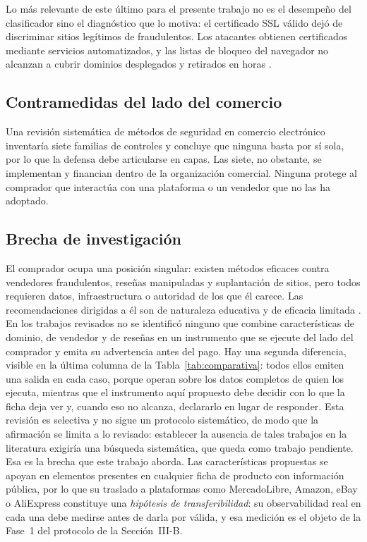Lo más relevante de este último para el presente trabajo no es el desempeño del clasificador
sino el diagnóstico que lo motiva: el certificado SSL válido dejó de discriminar sitios
legítimos de fraudulentos. Los atacantes obtienen certificados mediante servicios automatizados,
y las listas de bloqueo del navegador no alcanzan a cubrir dominios desplegados y retirados en
horas \cite{ref25}.

\subsection{Contramedidas del lado del comercio}

Una revisión sistemática de métodos de seguridad en comercio electrónico \cite{ref30} inventaría
siete familias de controles y concluye que ninguna basta por sí sola, por lo que la
defensa debe articularse en capas. Las siete, no obstante, se implementan y financian dentro
de la organización comercial. Ninguna protege al comprador que interactúa con una plataforma o
un vendedor que no las ha adoptado.

\subsection{Brecha de investigación}

El comprador ocupa una posición singular: existen métodos eficaces contra vendedores
fraudulentos, reseñas manipuladas y suplantación de sitios, pero todos requieren datos,
infraestructura o autoridad de los que él carece. Las recomendaciones dirigidas a él son de
naturaleza educativa y de eficacia limitada \cite{ref27, ref3}. En los trabajos revisados no
se identificó ninguno que combine características de dominio, de vendedor y de reseñas en un
instrumento que se ejecute del lado del comprador y emita su advertencia antes del pago. Hay
una segunda diferencia, visible en la última columna de la Tabla~\ref{tab:comparativa}: todos
ellos emiten una salida en cada caso, porque operan sobre los datos completos de quien los
ejecuta, mientras que el instrumento aquí propuesto debe decidir con lo que la ficha deja ver
y, cuando eso no alcanza, declararlo en lugar de responder. Esta
revisión es selectiva y no sigue un protocolo sistemático, de modo que la afirmación se limita
a lo revisado: establecer la ausencia de tales trabajos en la literatura exigiría una búsqueda
sistemática, que queda como trabajo pendiente. Esa es la brecha que este trabajo aborda. Las
características propuestas se apoyan en elementos presentes en cualquier ficha de producto con
información pública, por lo que su traslado a plataformas como MercadoLibre, Amazon, eBay o
AliExpress constituye una \emph{hipótesis de transferibilidad}: su observabilidad real en cada
una debe medirse antes de darla por válida, y esa medición es el objeto de la Fase~1 del
protocolo de la Sección~III-B.
